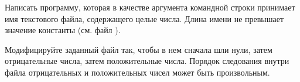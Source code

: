 
Написать программу, которая в качестве аргумента командной строки
принимает имя текстового файла, содержащего целые числа. Длина
имени не превышает значение константы  (см. файл
).

Модифицируйте заданный файл так, чтобы в нем сначала
шли нули, затем отрицательные числа, затем положительные числа.
Порядок следования внутри файла отрицательных и положительных
чисел может быть произвольным.
